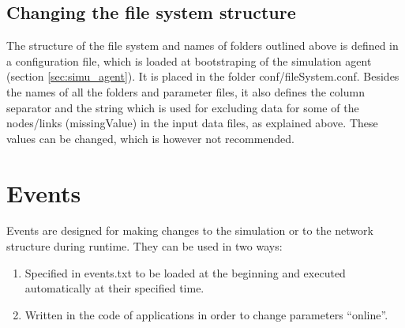 \documentclass[11pt,fleqn]{book} %
\newcommand{\mainagent}{simulation agent}
\begin{document}
\subsection{Changing the file system structure}
The structure of the file system and names of folders outlined above is defined in a configuration file, which is loaded at bootstraping of the \mainagent{} (section \ref{sec:simu_agent}). It is placed in the folder conf/fileSystem.conf. Besides the names of all the folders and parameter files, it also defines the column separator and the string which is used for excluding data for some of the nodes/links (missingValue) in the input data files, as explained above. These values can be changed, which is however not recommended.


\section{Events}\label{sec:events}
Events are designed for making changes to the simulation or to the network structure during runtime. They can be used in two ways:
\begin{enumerate}
	\item Specified in events.txt to be loaded at the beginning and executed automatically at their specified time. 
	\item Written in the code of applications in order to change parameters “online”.
\end{enumerate}
\end{document}
